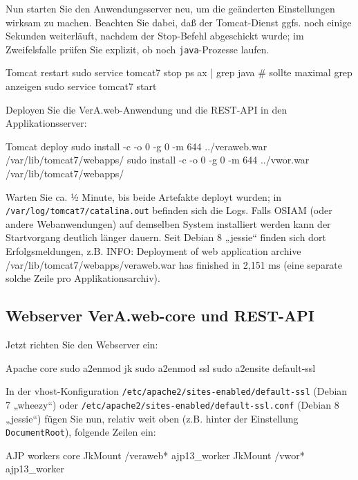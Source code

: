 Nun starten Sie den Anwendungsserver neu, um die geänderten
Einstellungen wirksam zu machen. Beachten Sie dabei, daß der
Tomcat-Dienst ggfs. noch einige Sekunden weiterläuft, nachdem
der Stop-Befehl abgeschickt wurde; im Zweifelsfalle prüfen Sie
explizit, ob noch \texttt{java}-Prozesse laufen.\keinumbruch

\begin{minipage}{\textwidth}
\begin{lstdump}{Tomcat restart}
sudo service tomcat7 stop
ps ax | grep java # sollte maximal grep anzeigen
sudo service tomcat7 start
\end{lstdump}
\end{minipage}

\begin{minipage}{\textwidth}
Deployen Sie die VerA.web-Anwendung und die REST-API in den Applikationsserver:

\begin{lstdump}{Tomcat deploy}
sudo install -c -o 0 -g 0 -m 644 ../veraweb.war /var/lib/tomcat7/webapps/
sudo install -c -o 0 -g 0 -m 644 ../vwor.war /var/lib/tomcat7/webapps/
\end{lstdump}
\end{minipage}

Warten Sie ca. ½ Minute, bis beide Artefakte deployt wurden; in
\texttt{/var/log/tomcat7/catalina.out} befinden sich die Logs.
\ifoa
Falls OSIAM (oder andere Webanwendungen) auf demselben System
installiert werden kann der Startvorgang deutlich länger dauern.
\fi%
Seit Debian 8 „jessie“ finden sich dort Erfolgsmeldungen, z.B.
{\ttfamily INFO: Deployment of web application archive
/var/lib/tomcat7/webapps/veraweb.war has finished in 2,151 ms}
(eine separate solche Zeile pro Applikationsarchiv).

\subsection{Webserver VerA.web-core und REST-API}\label{subsec:setup-core-apache}

\begin{minipage}{\textwidth}
Jetzt richten Sie den Webserver ein:

\begin{lstdump}{Apache core}
sudo a2enmod jk
sudo a2enmod ssl
sudo a2ensite default-ssl
\end{lstdump}
\end{minipage}

\begin{minipage}{\textwidth}
In der vhost-Konfiguration \texttt{/etc/apache2/sites-enabled/default-ssl}
(Debian 7 „wheezy“) oder \texttt{/etc/apache2/sites-enabled/default-ssl.conf}
(Debian 8 „jessie“) fügen Sie nun, relativ weit oben (z.B. hinter der Einstellung
\texttt{DocumentRoot}), folgende Zeilen ein:

\begin{lstdump}{AJP workers core}
JkMount /veraweb* ajp13_worker
JkMount /vwor* ajp13_worker
\end{lstdump}
\end{minipage}

